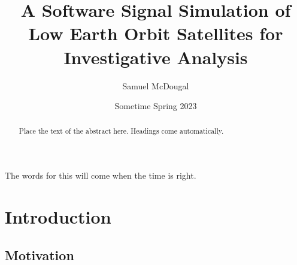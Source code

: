 \documentclass[12pt]{report}
\title{A Software Signal Simulation of Low Earth Orbit Satellites for Investigative Analysis}
\author{Samuel McDougal}
\date{Sometime Spring 2023} %
\begin{document}
\begin{romanpages}      %

\TitlePage 

\begin{abstract} 
Place the text of the abstract here. Headings come automatically.
\end{abstract}

\begin{acknowledgments}
The words for this will come when the time is right.
\end{acknowledgments}

\begin{singlespace}

\begin{center} 
\renewcommand{\cftchapfont}{}
\renewcommand{\cftchappagefont}{}
\renewcommand{\cfttoctitlefont}{\normalsize}%
\renewcommand{\cftsecfont }{\normalsize}%
\renewcommand{\cftsecpagefont}{\normalsize}%
\tableofcontents 
\newpage
\renewcommand{\cftchapfont}{}
\renewcommand{\cftchappagefont}{}
\renewcommand{\cftloftitlefont}{\normalsize}%
\renewcommand{\cftsecfont}{\normalsize}%
\renewcommand{\cftsecpagefont}{\normalsize}%
\listoffigures
\newpage
\renewcommand{\cftchapfont}{}
\renewcommand{\cftchappagefont}{}
\renewcommand{\cftlottitlefont}{\normalsize}%
\renewcommand{\cftsecfont}{\normalsize}%
\renewcommand{\cftsecpagefont}{\normalsize}%
\listoftables
\end{center}
\end{singlespace}

\printnomenclature[0.5in] %
\end{romanpages}        %


\normalem       %

 \chapter { Introduction}  %

\section { \normalfont Motivation}
\end{document}
